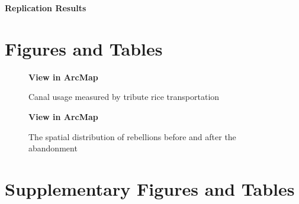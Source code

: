 \documentclass[12pt]{article}%
\begin{document}
\begin{center}
    \Large{\textbf{Replication Results}} \\
\end{center} 

\section*{Figures and Tables}

\begin{figure}[htbp!]\captionsetup{justification=centering,singlelinecheck=false,width=0.8\textwidth}
    \begin{center}
    \caption{Canal usage measured by tribute rice transportation}
    \textbf{View  in ArcMap} \\ 
    \end{center}
\end{figure}

 \clearpage

\begin{figure}[p]\captionsetup{justification=centering,singlelinecheck=false,width=0.8\textwidth}
    \begin{center}
    \caption{The spatial distribution of rebellions before and after the abandonment}
    \textbf{View  in ArcMap} \\ 
    \end{center}
\end{figure}
 \clearpage
 \clearpage
 \clearpage
 \clearpage
 \clearpage
 \clearpage
 \clearpage
 \clearpage

\appendix 
\setcounter{figure}{0}
\renewcommand{\thefigure}{\thesection \arabic{figure}}
\setcounter{table}{0}
\renewcommand{\thetable}{\thesection \arabic{table}}

\section{Supplementary Figures and Tables}
 \clearpage
 \clearpage
 \clearpage
 \clearpage
 \clearpage
 \clearpage
 \clearpage
 \clearpage
 \clearpage
 \clearpage
 \clearpage
 \clearpage
 \clearpage
 \clearpage
\end{document}
